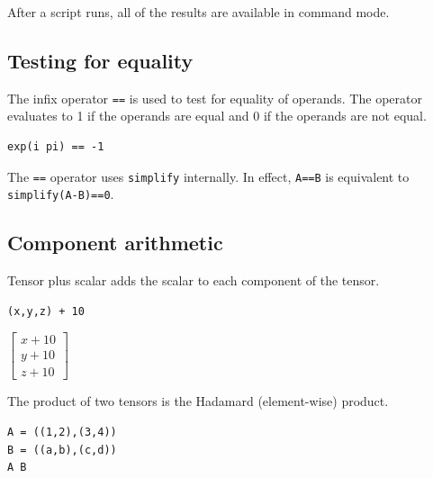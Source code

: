 \documentclass[12pt]{article}
\begin{document}
After a script runs, all of the results are available in command mode.

\newpage





\newpage

\subsection{Testing for equality}
The infix operator \verb$==$ is used to test for equality of operands.
The operator evaluates to 1 if the operands are equal and 0 if the operands are not equal.

\begin{Verbatim}[formatcom=\color{blue}]
exp(i pi) == -1
\end{Verbatim}


\bigskip
\noindent
The \verb$==$ operator uses \verb$simplify$ internally.
In effect, \verb$A==B$ is equivalent to \verb$simplify(A-B)==0$.











\subsection{Component arithmetic}

\noindent
Tensor plus scalar adds the scalar to each component of the tensor.

{\color{blue}
\begin{verbatim}
(x,y,z) + 10
\end{verbatim}
}

\noindent
$\displaystyle
\begin{bmatrix}
x+10
\\[1ex]
y+10
\\[1ex]
z+10
\end{bmatrix}
$

\bigskip
\noindent
The product of two tensors is the Hadamard (element-wise) product.

{\color{blue}
\begin{verbatim}
A = ((1,2),(3,4))
B = ((a,b),(c,d))
A B
\end{verbatim}
}
\end{document}
